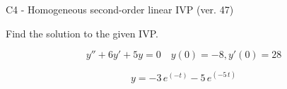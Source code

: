 \begin{exercise}
  \begin{exerciseTitle}C4 - Homogeneous second-order linear IVP (ver. 47)\end{exerciseTitle}
  \begin{exerciseStatement}
    
Find the solution to the given IVP.

    
\[y''+6y'+5y = 0 \hspace{1em} y(0) = -8 , y'(0) = 28\]

  \end{exerciseStatement}
  \begin{exerciseAnswer}
    
\[y= -3 \, e^{\left(-t\right)} - 5 \, e^{\left(-5 \, t\right)}\]

  \end{exerciseAnswer}
\end{exercise}